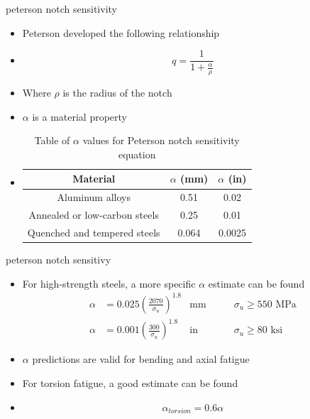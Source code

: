 \documentclass[10pt]{beamer}
\begin{document}
\begin{frame}{peterson notch sensitivity}
	\begin{itemize}[<+->]
		\item Peterson developed the following relationship
		\item[] \begin{equation}
		q = \frac{1}{1+\frac{\alpha}{\rho}}
		\end{equation}
		\item Where $\rho$ is the radius of the notch
		\item $\alpha$ is a material property
		\item[]
		\begin{table}
			\caption{Table of $\alpha$ values for Peterson notch sensitivity equation}
			\begin{tabular}{ccc}
				Material & $\alpha$ (mm) & $\alpha$ (in) \\ 
				\hline Aluminum alloys & 0.51 & 0.02 \\ 
				Annealed or low-carbon steels & 0.25 & 0.01 \\ 
				Quenched and tempered steels & 0.064 & 0.0025 
			\end{tabular} 
		\end{table}
	\end{itemize}
\end{frame}

\begin{frame}{peterson notch sensitivy}
	\begin{itemize}[<+->]
		\item For high-strength steels, a more specific $\alpha$ estimate can be found
		\begin{align}
		\alpha &= 0.025 \left(\frac{2070 }{\sigma_u}\right)^{1.8} & \text{mm} & \qquad \sigma_u \ge 550 \text{ MPa}\\
		\alpha &= 0.001 \left(\frac{300 }{\sigma_u}\right)^{1.8} & \text{in} & \qquad \sigma_u \ge 80 \text{ ksi}
		\end{align}
		\item $\alpha$ predictions are valid for bending and axial fatigue
		\item For torsion fatigue, a good estimate can be found
		\item[] \begin{equation}
		\alpha_{torsion} = 0.6 \alpha
		\end{equation}
	\end{itemize}
\end{frame}
\end{document}
